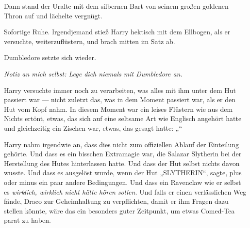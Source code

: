 Dann stand der Uralte mit dem silbernen Bart von seinem großen goldenen Thron auf und lächelte vergnügt.

Sofortige Ruhe. Irgendjemand stieß Harry hektisch mit dem Ellbogen, als er versuchte, weiterzuflüstern, und brach mitten im Satz ab.

Dumbledore setzte sich wieder.

\emph{Notiz an mich selbst: Lege dich niemals mit Dumbledore an.}

Harry versuchte immer noch zu verarbeiten, was alles mit ihm unter dem Hut passiert war — nicht zuletzt das, was in dem Moment passiert war, als er den Hut vom Kopf nahm. In diesem Moment war ein leises Flüstern wie aus dem Nichts ertönt, etwas, das sich auf eine seltsame Art wie Englisch angehört hatte und gleichzeitig ein Zischen war, etwas, das gesagt hatte: „“

Harry nahm irgendwie an, dass dies nicht zum offiziellen Ablauf der Einteilung gehörte. Und dass es ein bisschen Extramagie war, die Salazar Slytherin bei der Herstellung des Hutes hinterlassen hatte. Und dass der Hut selbst nichts davon wusste. Und dass es ausgelöst wurde, wenn der Hut
„SLYTHERIN“, sagte, plus oder minus ein paar andere Bedingungen. Und dass ein Ravenclaw wie er selbst es \emph{wirklich, wirklich nicht hätte hören sollen.} Und falls er einen verlässlichen Weg fände, Draco zur Geheimhaltung zu verpflichten, damit er ihm Fragen dazu stellen könnte, wäre das ein besonders guter Zeitpunkt, um etwas Comed-Tea parat zu haben.

